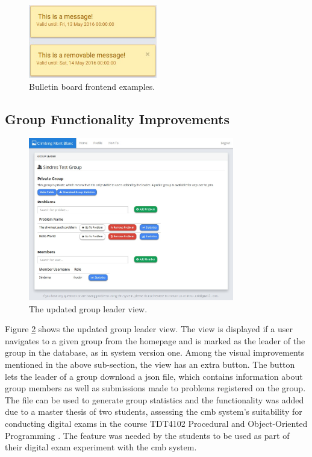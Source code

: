 \begin{figure}[t!]
    \centering
    \includegraphics[width=0.5\textwidth]{figs/bulletin_view.jpg}
    \caption[Bulletin board frontend examples]{Bulletin board frontend examples.}
    \label{fig:bulletin-view}
\end{figure}

\subsection{Group Functionality Improvements}
\begin{figure}[h!]
    \centering
    \includegraphics[width=0.8\textwidth]{figs/new_leader.jpg}
    \caption[The updated group leader view]{The updated group leader view.}
    \label{fig:new-leader}
\end{figure}
Figure \ref{fig:new-leader} shows the updated group leader view. The view is displayed if a user navigates to a given group from the homepage and is marked as the leader of the group in the database, as in system version one. Among the visual improvements mentioned in the above sub-section, the view has an extra button. The button lets the leader of a group download a \gls{json} file, which contains information about group members as well as submissions made to problems registered on the group. The file can be used to generate group statistics and the functionality was added due to a master thesis of two students, assessing the \gls{cmb} system's suitability for conducting digital exams in the course TDT4102 Procedural and Object-Oriented Programming \cite{TDT4102}. The feature was needed by the students to be used as part of their digital exam experiment with the \gls{cmb} system. \\


